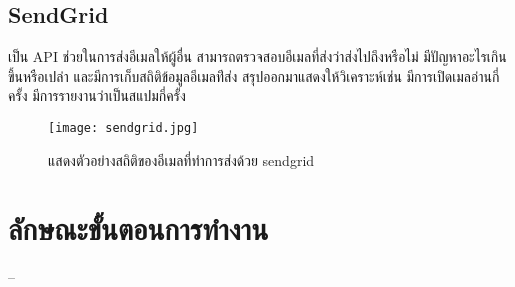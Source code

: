 \subsection{SendGrid}

เป็น API ช่วยในการส่งอีเมลให้ผู้อื่น สามารถตรวจสอบอีเมลที่ส่งว่าส่งไปถึงหรือไม่ มีปัญหาอะไรเกินขึ้นหรือเปล่า และมีการเก็บสถิติข้อมูลอีเมลท่ีส่ง สรุปออกมาแสดงให้วิเคราะห์เช่น มีการเปิดเมลอ่านกี่ครั้ง มีการรายงานว่าเป็นสแปมกี่ครั้ง

\begin{figure}[H]
  \centering
  \texttt{[image: sendgrid.jpg]}
  \caption{แสดงตัวอย่างสถิติของอีเมลที่ทำการส่งด้วย sendgrid}
  \label{Fig:robo3t}
\end{figure}

\section{ลักษณะขั้นตอนการทํางาน}

--

